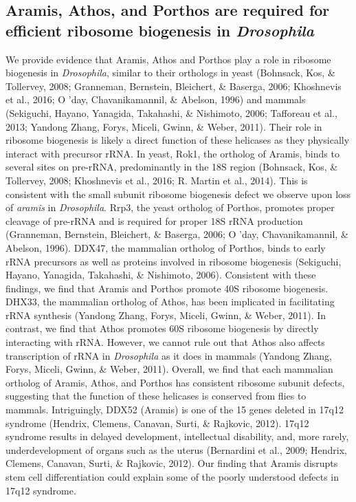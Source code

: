 \documentclass[12pt,oneside]{reedthesis}
\begin{document}
\hypertarget{aramis-athos-and-porthos-are-required-for-efficient-ribosome-biogenesis-in-drosophila}{%
\subsection{\texorpdfstring{Aramis, Athos, and Porthos are required for efficient ribosome biogenesis in \emph{Drosophila}}{Aramis, Athos, and Porthos are required for efficient ribosome biogenesis in Drosophila}}\label{aramis-athos-and-porthos-are-required-for-efficient-ribosome-biogenesis-in-drosophila}}

We provide evidence that Aramis, Athos and Porthos play a role in
ribosome biogenesis in \emph{Drosophila}, similar to their orthologs in yeast
(Bohnsack, Kos, \& Tollervey, 2008; Granneman, Bernstein, Bleichert, \& Baserga, 2006; Khoshnevis et al., 2016; O 'day, Chavanikamannil, \& Abelson, 1996) and
mammals (Sekiguchi, Hayano, Yanagida, Takahashi, \& Nishimoto, 2006; Tafforeau et al., 2013; Yandong Zhang, Forys, Miceli, Gwinn, \& Weber, 2011). Their role in ribosome
biogenesis is likely a direct function of these helicases as they
physically interact with precursor rRNA. In yeast, Rok1, the ortholog of
Aramis, binds to several sites on pre-rRNA, predominantly in the 18S
region (Bohnsack, Kos, \& Tollervey, 2008; Khoshnevis et al., 2016; R. Martin et al., 2014). This is consistent with the
small subunit ribosome biogenesis defect we observe upon loss of
\emph{aramis} in \emph{Drosophila}. Rrp3, the yeast ortholog of Porthos, promotes
proper cleavage of pre-rRNA and is required for proper 18S rRNA
production (Granneman, Bernstein, Bleichert, \& Baserga, 2006; O 'day, Chavanikamannil, \& Abelson, 1996). DDX47, the
mammalian ortholog of Porthos, binds to early rRNA precursors as well as
proteins involved in ribosome biogenesis
(Sekiguchi, Hayano, Yanagida, Takahashi, \& Nishimoto, 2006). Consistent with these findings,
we find that Aramis and Porthos promote 40S ribosome biogenesis. DHX33,
the mammalian ortholog of Athos, has been implicated in facilitating
rRNA synthesis (Yandong Zhang, Forys, Miceli, Gwinn, \& Weber, 2011). In contrast,
we find that Athos promotes 60S ribosome biogenesis by directly
interacting with rRNA. However, we cannot rule out that Athos also
affects transcription of rRNA in \emph{Drosophila} as it does in mammals
(Yandong Zhang, Forys, Miceli, Gwinn, \& Weber, 2011). Overall, we find that each
mammalian ortholog of Aramis, Athos, and Porthos has consistent ribosome
subunit defects, suggesting that the function of these helicases is
conserved from flies to mammals. Intriguingly, DDX52 (Aramis) is one of
the 15 genes deleted in 17q12 syndrome
(Hendrix, Clemens, Canavan, Surti, \& Rajkovic, 2012). 17q12 syndrome results in
delayed development, intellectual disability, and, more rarely,
underdevelopment of organs such as the uterus
(Bernardini et al., 2009; Hendrix, Clemens, Canavan, Surti, \& Rajkovic, 2012). Our finding that Aramis
disrupts stem cell differentiation could explain some of the poorly
understood defects in 17q12 syndrome.
\end{document}
